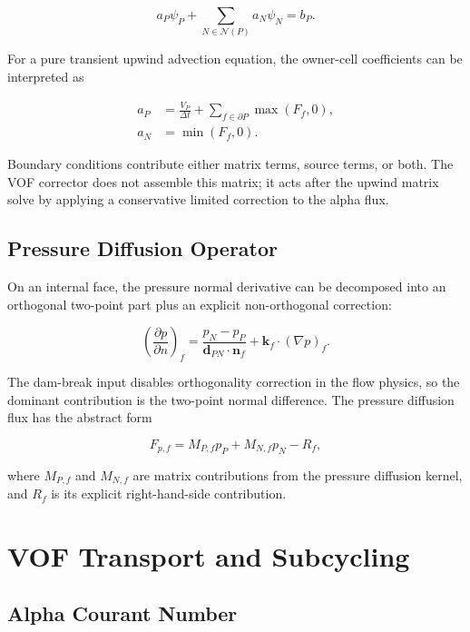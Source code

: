 \documentclass[11pt]{article}
\newcommand{\grad}{\nabla}
\newcommand{\nb}{\mathcal{N}}
\begin{document}
\begin{equation}
  a_P\psi_P+\sum_{N\in\nb(P)}a_N\psi_N=b_P.
\end{equation}

For a pure transient upwind advection equation, the owner-cell coefficients can
be interpreted as

\begin{align}
  a_P
  &=
  \frac{V_P}{\Delta t}
  +
  \sum_{f\in\partial P}\max(F_f,0),
  \\
  a_N
  &=
  \min(F_f,0).
\end{align}

Boundary conditions contribute either matrix terms, source terms, or both.  The
VOF corrector does not assemble this matrix; it acts after the upwind matrix
solve by applying a conservative limited correction to the alpha flux.

\subsection{Pressure Diffusion Operator}

On an internal face, the pressure normal derivative can be decomposed into an
orthogonal two-point part plus an explicit non-orthogonal correction:

\begin{equation}
  \left(\frac{\partial p}{\partial n}\right)_f
  =
  \frac{p_N-p_P}{\mathbf{d}_{PN}\cdot\mathbf{n}_f}
  +
  \mathbf{k}_f\cdot(\grad p)_f.
\end{equation}

The dam-break input disables orthogonality correction in the flow physics, so
the dominant contribution is the two-point normal difference.  The pressure
diffusion flux has the abstract form

\begin{equation}
  F_{p,f}
  =
  M_{P,f}p_P+M_{N,f}p_N-R_f,
  \label{eq:pressure-discrete-flux}
\end{equation}

where \(M_{P,f}\) and \(M_{N,f}\) are matrix contributions from the pressure
diffusion kernel, and \(R_f\) is its explicit right-hand-side contribution.

\section{VOF Transport and Subcycling}

\subsection{Alpha Courant Number}
\end{document}
